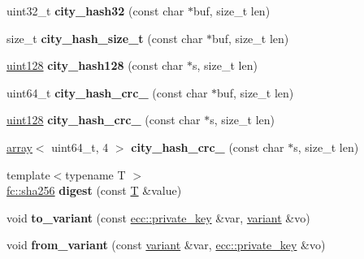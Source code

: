 \begin{DoxyCompactItemize}
\item 
\mbox{\label{namespacefc_a61954d69e71a9a610cdb843823459d35}} 
uint32\+\_\+t {\bfseries city\+\_\+hash32} (const char $\ast$buf, size\+\_\+t len)
\item 
\mbox{\label{namespacefc_a7b219440c7949d024ec8d150261ea9c4}} 
size\+\_\+t {\bfseries city\+\_\+hash\+\_\+size\+\_\+t} (const char $\ast$buf, size\+\_\+t len)
\item 
\mbox{\label{namespacefc_a63d1fe0e861957cf4daf4a0d2b744475}} 
\mbox{\hyperlink{classfc_1_1uint128}{uint128}} {\bfseries city\+\_\+hash128} (const char $\ast$s, size\+\_\+t len)
\item 
\mbox{\label{namespacefc_a3c14bbcaaa61ee3d55965861a17a8a9c}} 
uint64\+\_\+t {\bfseries city\+\_\+hash\+\_\+crc\+\_} (const char $\ast$buf, size\+\_\+t len)
\item 
\mbox{\label{namespacefc_a9d66adb69f407e1d80839d2d0a72a94d}} 
\mbox{\hyperlink{classfc_1_1uint128}{uint128}} {\bfseries city\+\_\+hash\+\_\+crc\+\_} (const char $\ast$s, size\+\_\+t len)
\item 
\mbox{\label{namespacefc_ae738c65ef1d8bb7c121d6671f90383ff}} 
\mbox{\hyperlink{classfc_1_1array}{array}}$<$ uint64\+\_\+t, 4 $>$ {\bfseries city\+\_\+hash\+\_\+crc\+\_} (const char $\ast$s, size\+\_\+t len)
\item 
\mbox{\label{namespacefc_a150ca4cd9c0318ca45dc0dc7df5d58b9}} 
{\footnotesize template$<$typename T $>$ }\\\mbox{\hyperlink{classfc_1_1sha256}{fc\+::sha256}} {\bfseries digest} (const \mbox{\hyperlink{struct_t}{T}} \&value)
\item 
\mbox{\label{namespacefc_a9330aaa2d3512be0c8bd703f596dbae2}} 
void {\bfseries to\+\_\+variant} (const \mbox{\hyperlink{classfc_1_1ecc_1_1private__key}{ecc\+::private\+\_\+key}} \&var, \mbox{\hyperlink{classfc_1_1variant}{variant}} \&vo)
\item 
\mbox{\label{namespacefc_a6e2ea4fbc5ca8914b51b1051bf6b7d7e}} 
void {\bfseries from\+\_\+variant} (const \mbox{\hyperlink{classfc_1_1variant}{variant}} \&var, \mbox{\hyperlink{classfc_1_1ecc_1_1private__key}{ecc\+::private\+\_\+key}} \&vo)

\end{DoxyCompactItemize}
